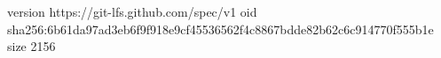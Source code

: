 version https://git-lfs.github.com/spec/v1
oid sha256:6b61da97ad3eb6f9f918e9cf45536562f4c8867bdde82b62c6c914770f555b1e
size 2156

